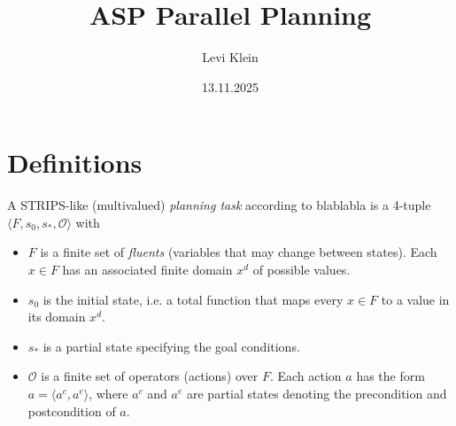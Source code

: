 \documentclass{article}
\begin{document}
\title{ASP Parallel Planning}
\author{Levi Klein}
\date{13.11.2025}
\maketitle
\section{Definitions}
A STRIPS-like (multivalued) \textit{planning task} according to blablabla is a 4-tuple $\langle F, s_0, s_*, \mathcal O \rangle$  with
\begin{itemize}[leftmargin=*]
    \item $F$ is a finite set of \emph{fluents} (variables that may change between states). Each $x\in F$ has an associated finite domain $x^d$ of possible values.
    \item $s_0$ is the initial state, i.e. a total function that maps every $x\in F$ to a value in its domain $x^d$.
    \item $s_*$ is a partial state specifying the goal conditions.
    \item $\mathcal O$ is a finite set of operators (actions) over $F$. Each action $a$ has the form $a=\langle a^c,a^e\rangle$, where $a^c$ and $a^e$ are partial states denoting the precondition and postcondition of $a$.
\end{itemize}
\end{document}
